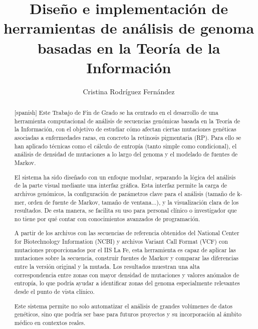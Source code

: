 \documentclass[11pt,spanish,listoffigures,listoftables]{tfgetsinf}
\title{Diseño e implementación de herramientas de análisis de genoma basadas en la Teoría de la Información}
\author{Cristina Rodríguez Fernández}
\begin{document}

\begin{abstract}[spanish]
   Este Trabajo de Fin de Grado se ha centrado en el desarrollo de una herramienta computacional de análisis de secuencias genómicas basada en la Teoría de la Información, con el objetivo de estudiar cómo afectan ciertas mutaciones genéticas asociadas a enfermedades raras, en concreto la retinosis pigmentaria (RP). Para ello se han aplicado técnicas como el cálculo de entropía (tanto simple como condicional), el análisis de densidad de mutaciones a lo largo del genoma y el modelado de fuentes de Markov. 

   El sistema ha sido diseñado con un enfoque modular, separando la lógica del análisis de la parte visual mediante una interfaz gráfica. Esta interfaz permite la carga de archivos genómicos, la configuración de parámetros clave para el análisis (tamaño de k-mer, orden de fuente de Markov, tamaño de ventana...), y la visualización clara de los resultados. De esta manera, se facilita su uso para personal clínico o investigador que no tiene por qué contar con conocimientos avanzados de programación. 

   A partir de los archivos con las secuencias de referencia obtenidos del National Center for Biotechnology Information (NCBI) y archivos Variant Call Format (VCF) con mutaciones proporcionados por el IIS La Fe, esta herramienta es capaz de aplicar las mutaciones sobre la secuencia, construir fuentes de Markov y comparar las diferencias entre la versión original y la mutada. Los resultados muestran una alta correspondencia entre zonas con mayor densidad de mutaciones y valores anómalos de entropía, lo que podría ayudar a identificar zonas del genoma especialmente relevantes desde el punto de vista clínico. 

   Este sistema permite no solo automatizar el análisis de grandes volúmenes de datos genéticos, sino que podría ser base para futuros proyectos y su incorporación al ámbito médico en contextos reales. 
   \\
   \\
\end{abstract}
\end{document}
